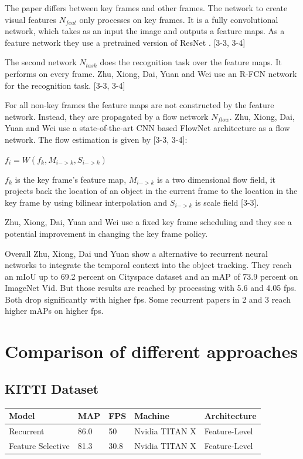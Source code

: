 \documentclass[conference]{IEEEtran}
\begin{document}
The paper differs between key frames and other frames. The network to create visual features $ N_{feat} $ only processes on key frames. It is a fully convolutional network, which takes as an input the image and outputs a feature maps. As a feature network they use a pretrained version of ResNet \cite{40}. [3-3, 3-4] \newline

The second network $ N_{task} $ does the recognition task over the feature maps. It performs on every frame.  Zhu, Xiong, Dai, Yuan and Wei use an R-FCN \cite{b19} network for the recognition task. [3-3, 3-4]  \newline

For all non-key frames the feature maps are not constructed by the feature network. Instead, they are propagated by a flow network $ N_{flow} $.  Zhu, Xiong, Dai, Yuan and Wei use a state-of-the-art CNN based FlowNet architecture \cite{b57} as a flow network. The flow estimation is given by [3-3, 3-4]: \newline

$ f_{i} =  W (f_{k},M_{i->k}, S_{i->k})$ \newline

$ f_{k} $ is the key frame's feature map, $ M_{i->k} $ is a two dimensional flow field, it projects back the location of an object in the current frame to the location in the key frame by using bilinear interpolation and  $ S_{i->k} $ is scale field [3-3]. \newline

Zhu, Xiong, Dai, Yuan and Wei use a fixed key frame scheduling and they  see a potential improvement in changing the key frame policy. \newline

Overall Zhu, Xiong, Dai und Yuan show  a alternative  to recurrent neural networks to integrate the temporal context into the object tracking. They reach an mIoU up to 69.2 percent on Cityspace dataset and an mAP of 73.9 percent on ImageNet Vid. But those results are reached by processing with 5.6 and 4.05 fps. Both drop significantly with higher fps. Some recurrent papers in 2 and 3 reach higher mAPs on higher fps. 

\section{Comparison of different approaches}

\subsection{KITTI Dataset}
\begin{tabular}{ | p{2cm} | p{2em}| p{2em} | p{4em} | p{5em} | } 
 \hline
 Model & MAP & FPS & Machine & Architecture \\
 \hline
 Recurrent \cite{b1} & 86.0 & 50 & Nvidia TITAN X & Feature-Level \\
 \hline
 Feature Selective \cite{b6} & 81.3 & 30.8 & Nvidia TITAN X & Feature-Level \\
 \hline
\end{tabular} \newline
\end{document}
